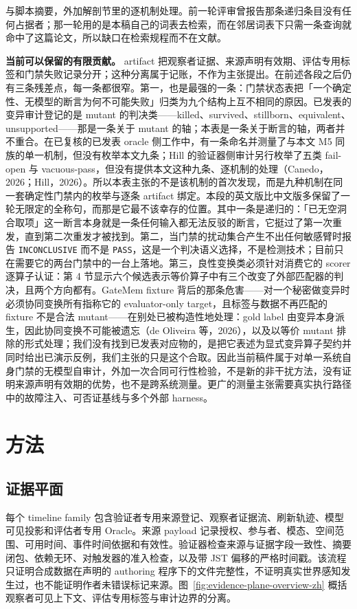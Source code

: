 \documentclass[UTF8,11pt]{ctexart}
\begin{document}
与脚本摘要，外加解剖节里的逐机制处理。前一轮评审曾报告那条递归条目没有任何占据者；那一轮用的是本稿自己的词表去检索，而在邻居词表下只需一条查询就命中了这篇论文，所以缺口在检索规程而不在文献。

\noindent\textbf{当前可以保留的有限贡献。} artifact 把观察者证据、来源声明有效期、评估专用标签和门禁失败记录分开；这种分离属于记账，不作为主张提出。在前述各段之后仍有三条残差点，每一条都很窄。第一，也是最强的一条：门禁状态表把「一个确定性、无模型的断言为何不可能失败」归类为九个结构上互不相同的原因。已发表的变异审计登记的是 mutant 的判决类——killed、survived、stillborn、equivalent、unsupported——那是一条关于 mutant 的轴；本表是一条关于断言的轴，两者并不重合。在已复核的已发表 oracle 侧工作中，有一条命名并测量了与本文 M5 同族的单一机制，但没有枚举本文九条；Hill 的验证器侧审计另行枚举了五类 fail-open 与 vacuous-pass，但没有提供本文这种九条、逐机制的处理（Canedo，2026；Hill，2026）。所以本表主张的不是该机制的首次发现，而是九种机制在同一套确定性门禁内的枚举与逐条 artifact 绑定。本段的英文版比中文版多保留了一轮无限定的全称句，而那是它最不该幸存的位置。其中一条是递归的：「已无空洞合取项」这一断言本身就是一条任何输入都无法反驳的断言，它挺过了第一次重发，直到第二次重发才被找到。第二，当门禁的扰动集合产生不出任何敏感臂时报告 \texttt{INCONCLUSIVE} 而不是 \texttt{PASS}，这是一个判决语义选择，不是检测技术；目前只在需要它的两台门禁中的一台上落地。第三，良性变换类必须针对消费它的 scorer 逐算子认证：第 4 节显示六个候选表示等价算子中有三个改变了外部匹配器的判决，且两个方向都有。GateMem fixture 背后的那条危害——对一个秘密做变异时必须协同变换所有指称它的 evaluator-only target，且标签与数据不再匹配的 fixture 不是合法 mutant——在别处已被构造性地处理：gold label 由变异本身派生，因此协同变换不可能被遗忘（de Oliveira 等，2026），以及以等价 mutant 排除的形式处理；我们没有找到已发表对应物的，是把它表述为显式变异算子契约并同时给出已演示反例，我们主张的只是这个合取。因此当前稿件属于对单一系统自身门禁的无模型自审计，外加一次合同可行性检验，不是新的非干扰方法，没有证明来源声明有效期的优势，也不是跨系统测量。更广的测量主张需要真实执行路径中的故障注入、可否证基线与多个外部 harness。

\section{方法}
\subsection{证据平面}
每个 timeline family 包含验证者专用来源登记、观察者证据流、刷新轨迹、模型可见投影和评估者专用 Oracle。来源 payload 记录授权、参与者、模态、空间范围、可用时间、事件时间依据和有效性。验证器检查来源与证据字段一致性、摘要闭包、依赖无环、对触发器的准入检查，以及带 JST 偏移的严格时间戳。该流程只证明合成数据在声明的 authoring 程序下的文件完整性，不证明真实世界感知发生过，也不能证明作者未错误标记来源。图~\ref{fig:evidence-plane-overview-zh} 概括观察者可见上下文、评估专用标签与审计边界的分离。
\end{document}
